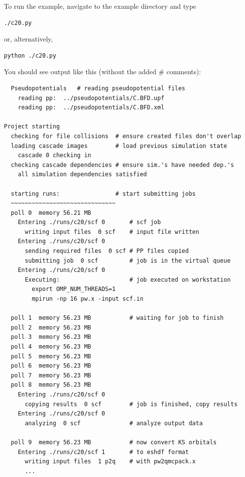 \documentclass[oneside,11pt]{memoir}
\numberwithin{equation}{section}
\begin{document}
To run the example, navigate to the example directory and type
\begin{shaded}
\begin{verbatim}
./c20.py
\end{verbatim}
\end{shaded}
or, alternatively, 
\begin{shaded}
\begin{verbatim}
python ./c20.py
\end{verbatim}
\end{shaded}

You should see output like this (without the added \# comments):
\begin{shaded}
\begin{verbatim}
  Pseudopotentials   # reading pseudopotential files
    reading pp:  ../pseudopotentials/C.BFD.upf
    reading pp:  ../pseudopotentials/C.BFD.xml

Project starting 
  checking for file collisions  # ensure created files don't overlap 
  loading cascade images        # load previous simulation state 
    cascade 0 checking in 
  checking cascade dependencies # ensure sim.'s have needed dep.'s
    all simulation dependencies satisfied 
  
  starting runs:                # start submitting jobs
  ~~~~~~~~~~~~~~~~~~~~~~~~~~~~~~
  poll 0  memory 56.21 MB 
    Entering ./runs/c20/scf 0       # scf job
      writing input files  0 scf    # input file written
    Entering ./runs/c20/scf 0 
      sending required files  0 scf # PP files copied
      submitting job  0 scf         # job is in the virtual queue
    Entering ./runs/c20/scf 0 
      Executing:                    # job executed on workstation
        export OMP_NUM_THREADS=1
        mpirun -np 16 pw.x -input scf.in 

  poll 1  memory 56.23 MB           # waiting for job to finish
  poll 2  memory 56.23 MB 
  poll 3  memory 56.23 MB 
  poll 4  memory 56.23 MB 
  poll 5  memory 56.23 MB 
  poll 6  memory 56.23 MB 
  poll 7  memory 56.23 MB 
  poll 8  memory 56.23 MB 
    Entering ./runs/c20/scf 0 
      copying results  0 scf        # job is finished, copy results
    Entering ./runs/c20/scf 0 
      analyzing  0 scf              # analyze output data
                                    
  poll 9  memory 56.23 MB           # now convert KS orbitals
    Entering ./runs/c20/scf 1       # to eshdf format
      writing input files  1 p2q    # with pw2qmcpack.x
      ...


\end{verbatim}
\end{shaded}
\end{document}

